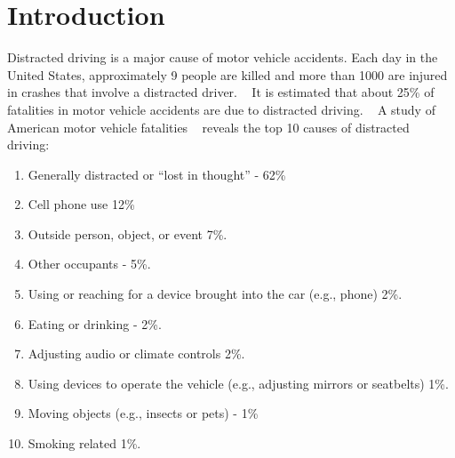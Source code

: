 \documentclass[conference,compsoc]{IEEEtran}
\begin{document}


\section{Introduction}
Distracted driving is a major cause of motor vehicle accidents. Each day in the United States, approximately 9 people are killed and more than 1000 are injured in crashes that involve a distracted driver. \unskip~\cite{1641075:26775855} It is estimated that about 25\% of fatalities in motor vehicle accidents are due to distracted driving. \unskip~\cite{1641075:26775848} A study of American motor vehicle fatalities \unskip~\cite{1641075:26775855} reveals the top 10 causes of distracted driving:


  
  \begin{enumerate}
  \item \relax Generally distracted or ``lost in thought'' -{\textendash} 62\%
  \item \relax Cell phone use {\textemdash} 12\%
  \item \relax Outside person, object, or event {\textendash} 7\%.
  \item \relax Other occupants -{\textendash} 5\%.
  \item \relax Using or reaching for a device brought into the car (e.g., phone) {\textendash} 2\%.
  \item \relax Eating or drinking -{\textendash} 2\%.
  \item \relax Adjusting audio or climate controls {\textemdash} 2\%.
  \item \relax Using devices to operate the vehicle (e.g., adjusting mirrors or seatbelts) {\textemdash} 1\%.
  \item \relax Moving objects (e.g., insects or pets) -{\textendash} 1\%
  \item \relax Smoking related {\textemdash} 1\%.
  \end{enumerate}
  
\end{document}
